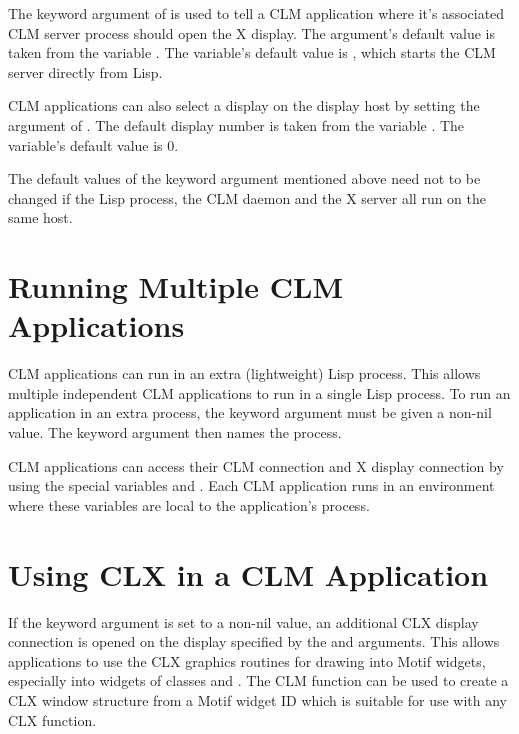 The keyword argument  of  is used
to tell a CLM application where it's associated CLM server process should open
the X display.  The argument's default value is taken from the variable
.  The variable's default value is
, which starts the CLM server directly from Lisp. 

CLM applications can also select a display on the display host by setting the
 argument of . The default
display number is taken from the variable .
The variable's default value is $0$.

The default values of the keyword argument mentioned above need not to be
changed if the Lisp process, the CLM daemon and the X server all run on the
same host. 

\section{Running Multiple CLM Applications}

CLM applications can run in an extra (lightweight) Lisp process.  This allows
multiple independent CLM applications to run in a single Lisp process.  To run
an application in an extra process, the  keyword argument must
be given a non-nil value.  The  keyword argument then names the
process. 

CLM applications can access their CLM connection and X display connection by
using the special variables  and
.  Each CLM application runs in an environment where
these variables are local to the application's process. 

\section{Using CLX in a CLM Application}

If the  keyword argument is set to a non-nil value, an additional
CLX display connection is opened on the display specified by the
 and  arguments.  This allows applications
to use the CLX graphics routines for drawing into Motif widgets, especially into
widgets of classes  and .  The CLM
function  can be used to create a CLX window structure
from a Motif widget ID which is suitable for use with any CLX function. 

